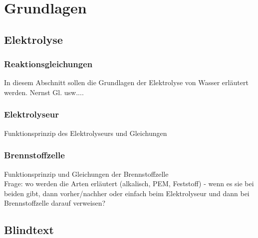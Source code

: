\chapter{Grundlagen}
\label{cha:Blabla}

\section{Elektrolyse}
\label{sec:Sektion 1}

\subsection{Reaktionsgleichungen}
\label{subsec:Abschnitt1}
In diesem Abschnitt sollen die Grundlagen der Elektrolyse von Wasser erläutert werden. Nernst Gl. usw....
\subsection{Elektrolyseur}
Funktionsprinzip des Elektrolyseurs und Gleichungen 

\subsection{Brennstoffzelle}
Funktionsprinzip und Gleichungen der Brennstoffzelle\\

Frage: wo werden die Arten erläutert (alkalisch, PEM, Feststoff) - wenn es sie bei beiden gibt, dann vorher/nachher oder einfach beim Elektrolyseur und dann bei Brennstoffzelle darauf verweisen? 



\section{Blindtext}


\Blindtext %
